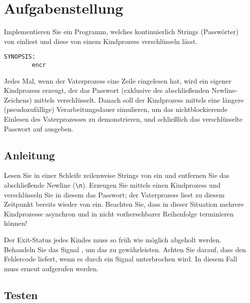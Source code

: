 




\section*{Aufgabenstellung}

Implementieren Sie ein Programm, welches kontinuierlich Strings
(Passwörter) von  einliest und diese von einem Kindprozess
verschlüsseln lässt.

\begin{verbatim}
SYNOPSIS:
        encr
\end{verbatim}

Jedes Mal, wenn der Vaterprozess eine Zeile eingelesen hat, wird ein
eigener Kindprozess erzeugt, der das Passwort (exklusive des
abschließenden Newline-Zeichens) mittels 
verschlüsselt. Danach soll der Kindprozess mittels 
eine längere (pseudozufällige) Verarbeitungsdauer simulieren, um das
nichtblockierende Einlesen des Vaterprozesses zu demonstrieren, und
schließlich das verschlüsselte Passwort auf  ausgeben.

\subsection*{Anleitung}

Lesen Sie in einer Schleife zeilenweise Strings von  ein
und entfernen Sie das abschließende Newline (\verb+\n+). Erzeugen Sie
mittels  einen Kindprozess und verschlüsseln Sie in
diesem das Passwort; der Vaterprozess liest zu diesem Zeitpunkt
bereits wieder von  ein. Beachten Sie, dass in dieser
Situation mehrere Kindprozesse asynchron und in nicht vorhersehbarer
Reihenfolge terminieren können!

Der Exit-Status jedes Kindes muss so früh wie möglich abgeholt werden.
Behandeln Sie das Signal , um das zu gewährleisten.
Achten Sie darauf, dass  den Fehlercode 
liefert, wenn es durch ein Signal unterbrochen wird. In diesem Fall
muss  erneut aufgerufen werden.

\subsection*{Testen}

